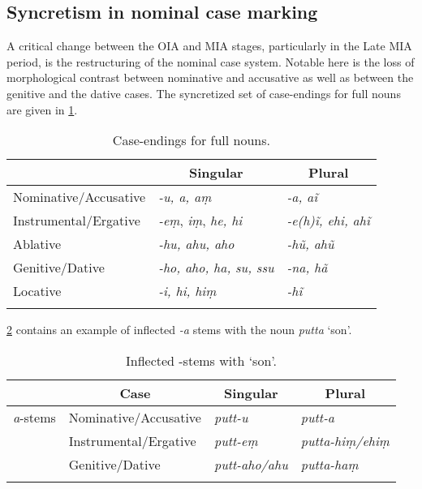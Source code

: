 \documentclass[output=paper,
modfonts
]{LSP/langsci}
\begin{document}
\subsection{Syncretism in nominal case marking}\label{case change}
A critical change between the OIA and MIA stages, particularly in the Late MIA period, 
is the restructuring of the nominal case system. Notable here is the loss of
morphological contrast between nominative and accusative as well
as between the genitive and the dative cases. The syncretized
set of case-endings for full nouns are  given in \cref{mia-table}. 

\begin{table}
\begin{tabular}[t]{lll}
\lsptoprule
& \multicolumn{1}{c}{Singular} & \multicolumn{1}{c}{Plural} \\
\midrule
Nominative/Accusative & \textit{-u, a, aṃ} & \textit{-a, aĩ} \\
Instrumental/Ergative &\textit{-eṃ}, \textit{iṃ}, \textit{he, hi} & \textit{-e(h)ĩ, ehi, ahĩ} \\
Ablative & \textit{-hu, ahu, aho} & \textit{-hũ, ahũ} \\
Genitive/Dative & \textit{-ho, aho, ha, su, ssu} & \textit{-na, hã} \\
Locative & \textit{-i, hi, hiṃ} & \textit{-hĩ} \\
\lspbottomrule
\end{tabular}
\caption{Case-endings for full nouns.}
\label{mia-table}
\end{table}


\cref{tab:putta} contains an example of inflected \textit{-a} stems with the noun \textit{putta} `son'. 
\begin{table}
\begin{tabular}[t]{llll}
\lsptoprule
\multicolumn{1}{c}{Stem} & \multicolumn{1}{c}{Case} & \multicolumn{1}{c}{Singular} & \multicolumn{1}{c}{Plural} \\
\midrule
\textit{a}-stems &  Nominative/Accusative  &  \textit{putt-u} & \textit{putt-a}   \\
 & Instrumental/Ergative & \textit{putt-eṃ} & \textit{putta-hiṃ/ehiṃ}  \\
 & Genitive/Dative & \textit{putt-aho/ahu}  & \textit{putta-haṃ}\\
 \lspbottomrule
\end{tabular} 
\caption{Inflected -stems with  `son'.}
\label{tab:putta}
\end{table}
 
\end{document}
